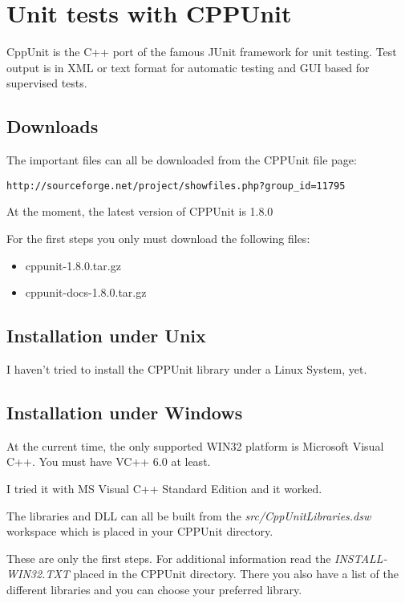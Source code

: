 \chapter{Unit tests with CPPUnit}

CppUnit is the C++ port of the famous JUnit framework for unit testing. Test %
output is in XML or text format for automatic testing and GUI based for %
supervised tests.


\section{Downloads}

The important files can all be downloaded from the CPPUnit file
page:
\begin{verbatim}
http://sourceforge.net/project/showfiles.php?group_id=11795
\end{verbatim}

At the moment, the latest version of CPPUnit is 1.8.0

For the first steps you only must download the following files:
\begin{itemize}
\item cppunit-1.8.0.tar.gz
\item cppunit-docs-1.8.0.tar.gz
\end{itemize}

\section{Installation under Unix}

I haven't tried to install the CPPUnit library under a Linux System, yet.

\section{Installation under Windows}

At the current time, the only supported WIN32 platform is Microsoft Visual C++. %
You must have VC++ 6.0 at least.

I tried it with MS Visual C++ Standard Edition and it worked.

The libraries and DLL can all be built from the %
\textit{src/CppUnitLibraries.dsw} workspace which is placed in your CPPUnit %
directory.

These are only the first steps. For additional information read the %
\textit{INSTALL-WIN32.TXT} placed in the CPPUnit directory. There you also have %
a list of the different libraries and you can choose your
preferred library.

